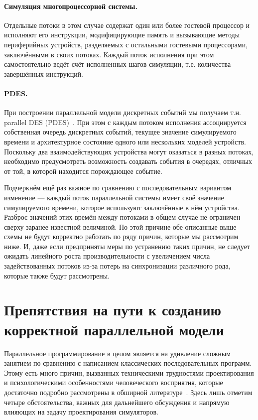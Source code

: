 \paragraph{Симуляция многопроцессорной системы.} Отдельные потоки в этом случае содержат один или более гостевой процессор и исполняют его инструкции, модифицирующие память и вызывающие методы периферийных устройств, разделяемых с остальными гостевыми процессорами, заключёнными в своих потоках. Каждый поток исполнения при этом самостоятельно ведёт счёт исполненных шагов симуляции, т.е. количества завершённых инструкций.

\paragraph{PDES.} При построении параллельной модели дискретных событий мы получаем т.н. parallel DES (PDES)~\cite{fujimoto-parallel-dist-sim, Fujimoto-pdes, Liu09paralleldiscrete-event, ferscha-1995-pdes}. При этом с каждым потоком исполнения ассоциируется собственная очередь дискретных событий, текущее значение симулируемого времени и архитектурное состояние одного или нескольких моделей устройств. Поскольку два взаимодействующих устройства могут оказаться в разных потоках, необходимо предусмотреть возможность создавать события в очередях, отличных от той, в которой находится порождающее событие.

Подчеркнём ещё раз важное по сравнению с последовательным вариантом изменение --- каждый поток параллельной системы имеет своё значение симулируемого времени, которое используют заключённые в нём устройства. Разброс значений этих времён между потоками в общем случае не ограничен сверху заранее известной величиной. По этой причине обе описанные выше схемы не будут корректно работать по ряду причин, которые мы рассмотрим ниже. И, даже если предприняты меры по устранению таких причин, не следует ожидать линейного роста производительности с увеличением числа задействованных потоков из-за потерь на синхронизации различного рода, которые также будут рассмотрены.

\section[Препятствия параллельной модели]{Препятствия на пути к созданию корректной параллельной модели}

Параллельное программирование в целом является на удивление сложным занятием по сравнению с написанием классических последовательных программ. Этому есть много причин, вызванных техническими трудностями проектирования и психологическими особенностями человеческого восприятия, которые достаточно подробно рассмотрены в обширной литературе~\cite{Herlihy:2008:AMP:1734069, toporkov2004, Andrews:1999:FPD:519301}. Здесь лишь отметим четыре обстоятельства, важных для дальнейшего обсуждения и напрямую влияющих на задачу проектирования симуляторов.

